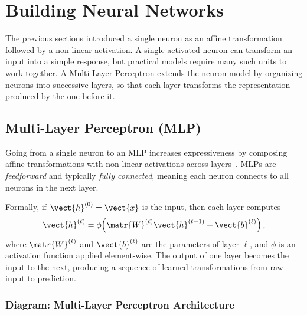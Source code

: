 
\section{Building Neural Networks}

The previous sections introduced a single neuron as an affine transformation followed by a non-linear activation. A single activated neuron can transform an input into a simple response, but practical models require many such units to work together. A Multi-Layer Perceptron extends the neuron model by organizing neurons into successive layers, so that each layer transforms the representation produced by the one before it.

\subsection{Multi-Layer Perceptron (MLP)}

Going from a single neuron to an MLP increases expressiveness by composing affine transformations with non-linear activations across layers~\cite{Rumelhart1986}. MLPs are \emph{feedforward} and typically \emph{fully connected}, meaning each neuron connects to all neurons in the next layer.

Formally, if $\vect{h}^{(0)}=\vect{x}$ is the input, then each layer computes
\begin{equation}
\vect{h}^{(\ell)} = \phi\!\left(\matr{W}^{(\ell)}\vect{h}^{(\ell-1)} + \vect{b}^{(\ell)}\right),
\end{equation}
where $\matr{W}^{(\ell)}$ and $\vect{b}^{(\ell)}$ are the parameters of layer $\ell$, and $\phi$ is an activation function applied element-wise. The output of one layer becomes the input to the next, producing a sequence of learned transformations from raw input to prediction.

	\subsubsection{Diagram: Multi-Layer Perceptron Architecture}

